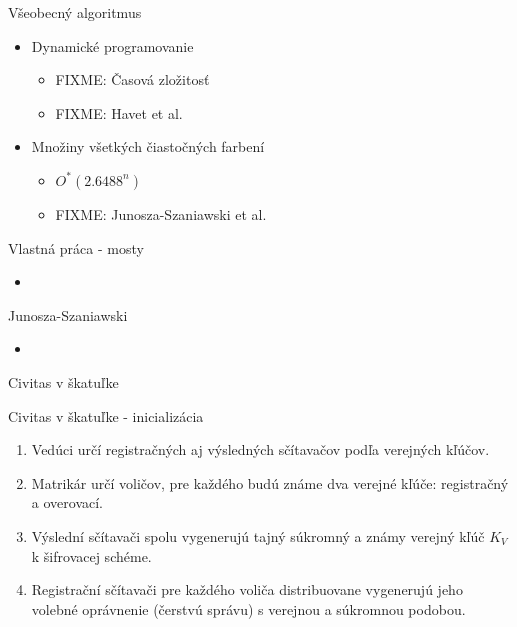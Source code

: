 \documentclass{beamer}
\begin{document}
\begin{frame}{Všeobecný algoritmus}
    \begin{itemize}
        \item Dynamické programovanie
        \begin{itemize}
            \item FIXME: Časová zložitosť
            \item FIXME: Havet et al.
        \end{itemize}
        \item Množiny všetkých čiastočných farbení
        \begin{itemize}
            \item $O^*(2.6488^n)$
            \item FIXME: Junosza-Szaniawski et al.
        \end{itemize}
    \end{itemize}
\end{frame}

\begin{frame}{Vlastná práca - mosty}
    \begin{itemize}
        \item
    \end{itemize}
\end{frame}

\begin{frame}{Junosza-Szaniawski}
    \begin{itemize}
        \item 
    \end{itemize}
\end{frame}

\begin{frame}{Civitas v škatuľke}
\end{frame}

\begin{frame}{Civitas v škatuľke - inicializácia}
    \begin{enumerate}
        \item Vedúci určí registračných aj výsledných sčítavačov podľa verejných kľúčov.
        \item Matrikár určí voličov, pre každého budú známe dva verejné kľúče: registračný a
        overovací.
        \item Výslední sčítavači spolu vygenerujú tajný súkromný a známy verejný kľúč $K_{V}$ k šifrovacej
        schéme.
        \item Registrační sčítavači pre každého voliča distribuovane vygenerujú jeho volebné oprávnenie (čerstvú
        správu) s verejnou a súkromnou podobou.
    \end{enumerate}
\end{frame}
\end{document}
